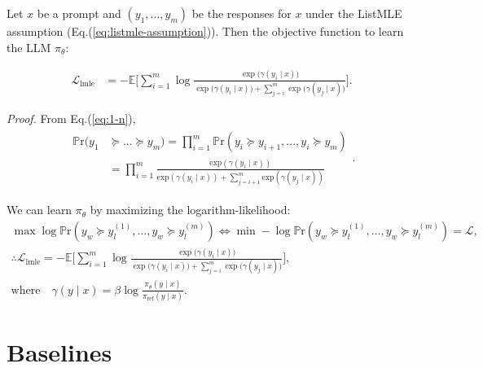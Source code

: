 \begin{theorem}
Let \( x \) be a prompt and \( (y_1, ..., y_m)  \) be the responses for \( x \) under the ListMLE assumption (Eq.(\ref{eq:listmle-assumption})).
Then the objective function to learn the LLM \( \pi_\theta \):
\end{theorem}

\begin{equation}
\begin{aligned}
    \mathcal{L}_{\text{lmle}} &= -\mathbb{E} \biggl[
    \sum^m_{i=1} \log \frac{\exp\bigl(\gamma(y_i \mid x)\bigr)}{
        \exp\bigl(\gamma(y_i \mid x)\bigr) + \sum_{j=i}^m \exp\bigl(\gamma(y_j \mid x)\bigr)}
    \biggr].
\end{aligned}
\end{equation}

\textit{Proof.}
From Eq.(\ref{eq:1-n}),
\begin{gather}
\begin{aligned}
    \mathbb{P}\text{r}(y_1 & \succeq ... \succeq y_m) = \prod^m_{i=1} \mathbb{P}\text{r}(y_i \succeq y_{i+1}, ..., y_i \succeq y_m)  \\
    & = \prod^m_{i=1} \frac{\text{exp}(\gamma(y_i \mid x))}{\text{exp}(\gamma(y_i \mid x)) + \sum^m_{j=i+1}\text{exp}(\gamma(y_j \mid x))}
\end{aligned}.
\end{gather}

We can learn $\pi_\theta$ by maximizing the logarithm-likelihood: 
\begin{gather}
\max \log \mathbb{P}\text{r}(y_w \succeq y^{(1)}_l, \dots, y_w \succeq y^{(m)}_l) \Leftrightarrow 
\min - \log \mathbb{P}\text{r}(y_w \succeq y^{(1)}_l, \dots, y_w \succeq y^{(m)}_l) = \mathcal{L}, \\
 \therefore \mathcal{L}_{\text{lmle}} = -\mathbb{E} \biggl[
    \sum^m_{i=1} \log \frac{\exp\bigl(\gamma(y_i \mid x)\bigr)}{
        \exp\bigl(\gamma(y_i \mid x)\bigr) + \sum_{j=i}^m \exp\bigl(\gamma(y_j \mid x)\bigr)}
    \biggr], \\
\text{where} \quad \gamma(y \mid x) = \beta \log \frac{\pi_\theta(y \mid x)}{\pi_{\mathrm{ref}}(y \mid x)}.
\end{gather}


\section{Baselines}\label{apx:sec:baselines}

